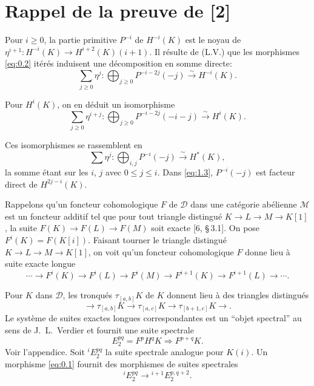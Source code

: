 \documentclass[11pt,a4paper]{article}
\theoremstyle{plain}
\theoremstyle{definition}
\newcommand{\cD}{\mathscr{D}}
\newcommand{\cM}{\mathscr{M}}
\begin{document}
\section{Rappel de la preuve de [2]}

Pour $i \geqslant 0$, la partie primitive $P^{-i}$ de $H^{-i}(K)$ est le noyau de $\eta^{i+1} \colon H^{-i}(K) \to H^{i+2}(K)(i+1)$. Il r\'esulte de (L.V.) que les morphismes \eqref{eq:0.2} it\'er\'es induisent une d\'ecomposition en somme directe:
\begin{equation}\label{eq:1.1}
\sum_{j \geqslant 0} \eta^j \colon \bigoplus_{j \geqslant 0} P^{-i-2j}(-j) \xrightarrow{\sim} H^{-i}(K).
\end{equation}

Pour $H^i(K)$, on en d\'eduit un isomorphisme
\begin{equation}\label{eq:1.2}
\sum_{j \geqslant 0} \eta^{i+j} \colon \bigoplus_{j \geqslant 0} P^{-i-2j}(-i-j) \xrightarrow{\sim} H^i(K).
\end{equation}

Ces isomorphismes se rassemblent en
\begin{equation}\label{eq:1.3}
\sum \eta^j \colon \bigoplus_{i,j} P^{-i}(-j) \xrightarrow{\sim} H^*(K),
\end{equation}
la somme \'etant sur les $i$, $j$ avec $0 \leqslant j \leqslant i$. Dans \eqref{eq:1.3}, $P^{-i}(-j)$ est facteur direct de $H^{2j-i}(K)$.

Rappelons qu'un foncteur cohomologique $F$ de $\cD$ dans une cat\'egorie ab\'elienne $\cM$ est un foncteur additif tel que pour tout triangle distingu\'e $K \to L \to M \to K[1]$, la suite $F(K) \to F(L) \to F(M)$ soit exacte [6, \S\,3.1]. On pose $F^i(K) = F(K[i])$. Faisant tourner le triangle distingu\'e $K \to L \to M \to K[1]$, on voit qu'un foncteur cohomologique $F$ donne lieu \`a suite exacte longue
\[
\cdots \to F^i(K) \to F^i(L) \to F^i(M) \to F^{i+1}(K) \to F^{i+1}(L) \to \cdots.
\]

Pour $K$ dans $\cD$, les tronqu\'es $\tau_{[a,b]}K$ de $K$ donnent lieu \`a des triangles distingu\'es
\[
\to \tau_{[a,b]}K \to \tau_{[a,c]}K \to \tau_{[b+1,c]}K \to .
\]
Le syst\`eme de suites exactes longues correspondantes est un ``objet spectral'' au sens de J.~L.~Verdier et fournit une suite spectrale
\[
E_2^{pq} = F^p H^q K \Rightarrow F^{p+q} K.
\]
Voir l'appendice. Soit ${}^i\!E_2^{pq}$ la suite spectrale analogue pour $K(i)$. Un morphisme \eqref{eq:0.1} fournit des morphismes de suites spectrales
\[
{}^i\!E_2^{pq} \to {}^{i+1}\!E_2^{p,q+2}.
\]
\end{document}
